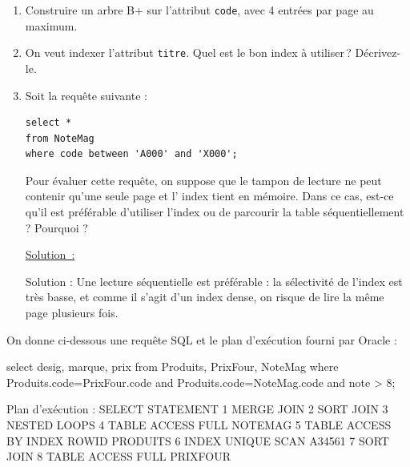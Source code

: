 \documentclass[french]{article}
\newenvironment{smallverbatim}%
{\endgraf\small\verbatimtab}{\endverbatimtab}
\newenvironment{solution}{\nopagebreak\par\vspace*{2mm}\underline{Solution~:}\em\par}{\par\vspace*{2mm}}
\begin{document}
\begin{enumerate}
  \item Construire un arbre B+ sur l'attribut \texttt{code}, 
       avec 4 entrées par page au maximum.

   \item On veut indexer l'attribut \texttt{titre}. Quel est le bon
        index à utiliser\,? Décrivez-le.
   \item Soit la requête suivante :

\begin{verbatim}
select *
from NoteMag
where code between 'A000' and 'X000';
\end{verbatim}

 Pour évaluer cette requête, on suppose que le tampon de lecture ne peut
 contenir qu'une seule page et l' index tient en mémoire. Dans ce cas, est-ce
 qu'il est préférable d'utiliser l'index ou de parcourir la table
 séquentiellement ? Pourquoi ?

\begin{solution}
 Solution : Une lecture séquentielle est préférable : la sélectivité de l'index
 est très basse, et comme il s'agit d'un index dense, on risque de lire la même
 page plusieurs fois.
\end{solution}

\end{enumerate}


On donne ci-dessous une requête SQL et le plan d'exécution fourni par Oracle :

\begin{smallverbatim}
select desig, marque, prix
  from Produits, PrixFour, NoteMag
 where Produits.code=PrixFour.code
   and Produits.code=NoteMag.code
   and note > 8;
\end{smallverbatim}

Plan d'exécution :
\begin{smallverbatim}
0 SELECT STATEMENT
  1 MERGE JOIN
    2 SORT JOIN
      3 NESTED LOOPS
        4 TABLE ACCESS FULL NOTEMAG
        5 TABLE ACCESS BY INDEX ROWID PRODUITS
          6 INDEX UNIQUE SCAN A34561
    7 SORT JOIN
      8 TABLE ACCESS FULL PRIXFOUR
\end{smallverbatim}
\end{document}
